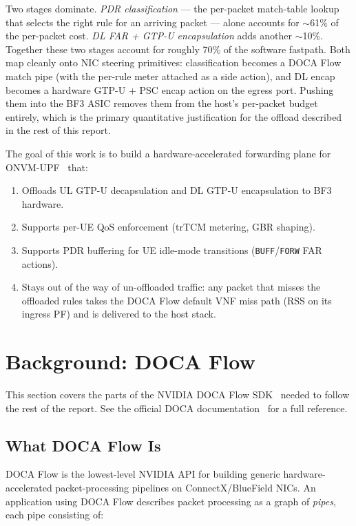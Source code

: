 \documentclass[conference]{IEEEtran}
\begin{document}
Two stages dominate.  \emph{PDR classification} --- the per-packet
match-table lookup that selects the right rule for an arriving
packet --- alone accounts for $\sim$61\% of the per-packet cost.
\emph{DL FAR + GTP-U encapsulation} adds another $\sim$10\%.
Together these two stages account for roughly 70\% of the software
fastpath.  Both map cleanly onto NIC steering primitives:
classification becomes a DOCA Flow match pipe (with the per-rule
meter attached as a side action), and DL encap becomes a hardware
GTP-U + PSC encap action on the egress port.  Pushing them into the
BF3 ASIC removes them from the host's per-packet budget entirely,
which is the primary quantitative justification for the offload
described in the rest of this report.

The goal of this work is to build a hardware-accelerated forwarding
plane for ONVM-UPF~\cite{onvm} that:
\begin{enumerate}
  \item Offloads UL GTP-U decapsulation and DL GTP-U encapsulation to BF3
        hardware.
  \item Supports per-UE QoS enforcement (trTCM metering, GBR shaping).
  \item Supports PDR buffering for UE idle-mode transitions
        (\texttt{BUFF}/\texttt{FORW} FAR actions).
  \item Stays out of the way of un-offloaded traffic: any packet that
        misses the offloaded rules takes the DOCA Flow default VNF
        miss path (RSS on its ingress PF) and is delivered to the
        host stack.
\end{enumerate}

\section{Background: DOCA Flow}
\label{sec:bg}

This section covers the parts of the NVIDIA DOCA Flow
SDK~\cite{doca} needed to follow the rest of the report.  See the
official DOCA documentation~\cite{doca} for a full reference.

\subsection{What DOCA Flow Is}

DOCA Flow is the lowest-level NVIDIA API for building generic
hardware-accelerated packet-processing pipelines on ConnectX/BlueField
NICs.  An application using DOCA Flow describes packet processing as
a graph of \emph{pipes}, each pipe consisting of:
\end{document}
